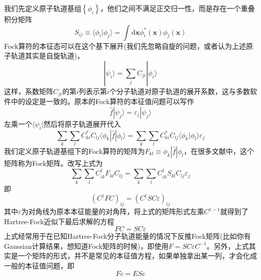 \documentclass[12pt,a4paper,openany,twoside]{book}
\numberwithin{equation}{section}
\begin{document}
          我们先定义原子轨道基组$\left\{\phi_i\right\}$，他们之间不满足正交归一性，而是存在一个重叠积分矩阵
          \begin{equation}
            {S}_{ij} \equiv \langle \phi_i|\phi_j\rangle = \int \mathrm{d} \mathbf{x} \phi_i^*(\mathbf{x})\phi_j(\mathbf{x})
          \end{equation}
          Fock算符的本征态可以在这个基下展开(我们先忽略自旋的问题，或者认为上述原子轨道其实是自旋轨道)，
          \begin{equation}
            |\psi_i\rangle = \sum_j C_{ji} |\phi_i\rangle
          \end{equation}
          这样，系数矩阵$C_{ji} $的第$i$列表示第$i$个分子轨道对原子轨道的展开系数，这与多数软件中的设定是一致的。原本的Fock算符的本征值问题可以写作
          \begin{equation}
            \hat{f}|\psi_j\rangle = \varepsilon_j |\psi_j\rangle
          \end{equation}
          左乘一个$\langle \psi_i|$然后将原子轨道展开代入
          \begin{equation}
            \sum_k\sum_l C_{ki}^* C_{lj} \langle \phi_k|\hat{f}|\phi_l\rangle = \sum_k\sum_l C_{ki}^* C_{lj} \langle \phi_k|\phi_l\rangle \varepsilon_j 
          \end{equation}
          我们定义原子轨道基组下的Fock算符的矩阵为$F_{kl} \equiv \phi_k|\hat{f}|\phi_l$，在很多文献中，这个矩阵称为Fock矩阵。改写上式为
          \begin{equation}
            \sum_k\sum_l C_{ik}^{\dagger} F_{kl} C_{lj} = \sum_k\sum_l  C_{ik}^{\dagger} S_{kl} C_{lj}\varepsilon_j 
          \end{equation}
          即
          \begin{equation}
            \left( C^{\dagger}FC \right)_{ij} = \left( C^{\dagger}SC \varepsilon\right)_{ij}
          \end{equation}
          其中$\varepsilon$为对角线为原本本征能量的对角阵，将上式的矩阵形式左乘$ C^{\dagger -1}$就得到了Hartree-Fock近似下最后求解的方程
          \begin{equation}
            FC = SC \varepsilon
            \label{matrix form of secular equation}
          \end{equation}
          上式经常用于在已知Hartree-Fock分子轨道能量的情况下反推Fock矩阵(比如你有Gaussian计算结果，想知道Fock矩阵的时候)，即使用$F = SC \varepsilon C^{-1}$。另外，上式其实是一个矩阵的形式，并不是常见的本征值方程，如果单独拿出某一列，才会化成一般的本征值问题，即
          \begin{equation}
            Fc = ESc
          \end{equation}
\end{document}
